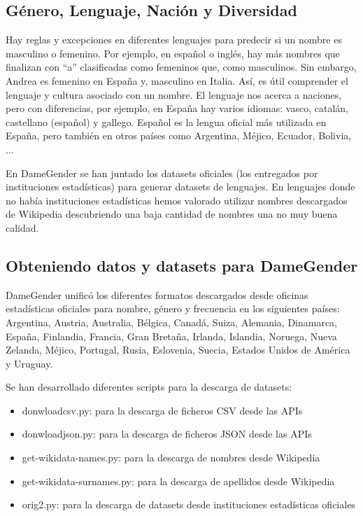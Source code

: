 \documentclass[a4paper]{article}
\begin{document}
\subsection{Género, Lenguaje, Nación y Diversidad}

Hay reglas y excepciones en diferentes lenguajes para predecir si
un nombre es masculino o femenino. Por ejemplo, en español o inglés,
hay más nombres que finalizan con ``a'' clasificadas como femeninos
que, como masculinos. Sin embargo, Andrea es femenino en España y,
masculino en Italia. Así, es útil comprender el lenguaje y cultura
asociado con un nombre. El lenguaje nos acerca a naciones, pero con
diferencias, por ejemplo, en España hay varios idiomas: vasco,
catalán, castellano (español) y gallego. Español es la lengua oficial
más utilizada en España, pero también en otros países como Argentina,
Méjico, Ecuador, Bolivia, ...

En DameGender se han juntado los datasets oficiales (los entregados
por instituciones estadísticas) para generar datasets de lenguajes.
En lenguajes donde no había instituciones estadísticas hemos valorado
utilizar nombres descargados de Wikipedia descubriendo una baja
cantidad de nombres una no muy buena calidad.

\subsection{Obteniendo datos y datasets para DameGender}

DameGender unificó los diferentes formatos descargados desde oficinas
estadísticas oficiales para nombre, género y frecuencia en los siguientes
países: Argentina, Austria, Australia, Bélgica, Canadá, Suiza, Alemania,
Dinamarca, España, Finlandia, Francia, Gran Bretaña, Irlanda, Islandia,
Noruega, Nueva Zelanda, Méjico, Portugal, Rusia, Eslovenia, Suecia,
Estados Unidos de América y Uruguay.

Se han desarrollado diferentes scripts para la descarga de datasets:
\begin{itemize}[noitemsep]
\item donwloadcsv.py: para la descarga de ficheros CSV desde las APIs
\item donwloadjson.py: para la descarga de ficheros JSON desde las APIs
\item get-wikidata-names.py: para la descarga de nombres desde Wikipedia
\item get-wikidata-surnames.py: para la descarga de apellidos desde Wikipedia
\item orig2.py: para la descarga de datasets desde instituciones estadísticas oficiales
\end{itemize}
\end{document}
